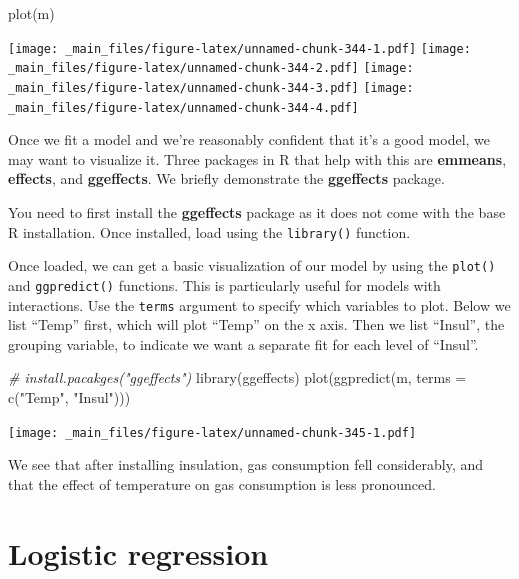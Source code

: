 \documentclass[
]{book}
\newenvironment{Shaded}{\begin{snugshade}}{\end{snugshade}}
\newcommand{\AttributeTok}[1]{\textcolor[rgb]{0.77,0.63,0.00}{#1}}
\newcommand{\CommentTok}[1]{\textcolor[rgb]{0.56,0.35,0.01}{\textit{#1}}}
\newcommand{\FunctionTok}[1]{\textcolor[rgb]{0.00,0.00,0.00}{#1}}
\newcommand{\NormalTok}[1]{#1}
\newcommand{\StringTok}[1]{\textcolor[rgb]{0.31,0.60,0.02}{#1}}
\begin{document}
\begin{Shaded}
\begin{Highlighting}[]
\FunctionTok{plot}\NormalTok{(m)}
\end{Highlighting}
\end{Shaded}

\texttt{[image: \_main\_files/figure-latex/unnamed-chunk-344-1.pdf]} \texttt{[image: \_main\_files/figure-latex/unnamed-chunk-344-2.pdf]} \texttt{[image: \_main\_files/figure-latex/unnamed-chunk-344-3.pdf]} \texttt{[image: \_main\_files/figure-latex/unnamed-chunk-344-4.pdf]}

Once we fit a model and we're reasonably confident that it's a good model, we may want to visualize it. Three packages in R that help with this are \textbf{emmeans}, \textbf{effects}, and \textbf{ggeffects}. We briefly demonstrate the \textbf{ggeffects} package.

You need to first install the \textbf{ggeffects} package as it does not come with the base R installation. Once installed, load using the \texttt{library()} function.

Once loaded, we can get a basic visualization of our model by using the \texttt{plot()} and \texttt{ggpredict()} functions. This is particularly useful for models with interactions. Use the \texttt{terms} argument to specify which variables to plot. Below we list ``Temp'' first, which will plot ``Temp'' on the x axis. Then we list ``Insul'', the grouping variable, to indicate we want a separate fit for each level of ``Insul''.

\begin{Shaded}
\begin{Highlighting}[]
\CommentTok{\# install.pacakges("ggeffects")}
\FunctionTok{library}\NormalTok{(ggeffects)}
\FunctionTok{plot}\NormalTok{(}\FunctionTok{ggpredict}\NormalTok{(m, }\AttributeTok{terms =} \FunctionTok{c}\NormalTok{(}\StringTok{"Temp"}\NormalTok{, }\StringTok{"Insul"}\NormalTok{)))}
\end{Highlighting}
\end{Shaded}

\texttt{[image: \_main\_files/figure-latex/unnamed-chunk-345-1.pdf]}

We see that after installing insulation, gas consumption fell considerably, and that the effect of temperature on gas consumption is less pronounced.

\hypertarget{logistic-regression}{%
\section{Logistic regression}\label{logistic-regression}}
\end{document}
